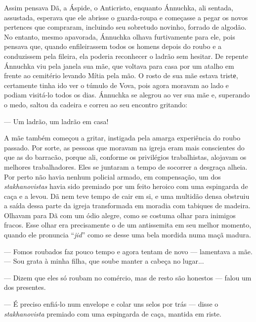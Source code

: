 Assim pensava Dã, a Áspide, o Anticristo, enquanto Ánnuchka, ali
sentada, assustada, esperava que ele abrisse o guarda-roupa e começasse
a pegar os novos pertences que compraram, incluindo seu sobretudo
novinho, forrado de algodão. No entanto, mesmo apavorada, Ánnuchka
olhava furtivamente para ele, pois pensava que, quando enfileirassem
todos os homens depois do roubo e a conduzissem pela fileira, ela
poderia reconhecer o ladrão sem hesitar. De repente Ánnuchka viu pela
janela sua mãe, que voltava para casa por um atalho em frente ao
cemitério levando Mítia pela mão. O rosto de sua mãe estava tristе,
certamente tinha ido ver o túmulo de Vova, pois agora moravam ao lado e
podiam visitá-lo todos os dias. Ánnuchka se alegrou ao ver sua mãe e,
superando o medo, saltou da cadeira e correu ao seu encontro gritando:

--- Um ladrão, um ladrão em casa!

A mãe também começou a gritar, instigada pela amarga experiência do
roubo passado. Por sorte, as pessoas que moravam na igreja eram mais
conscientes do que as do barracão, porque ali, conforme os privilégios
trabalhistas, alojavam os melhores trabalhadores. Eles se juntaram a
tempo de socorrer a desgraça alheia. Por perto não havia nenhum policial
armado, em compensação, um dos \emph{stakhanovistas} havia sido premiado
por um feito heroico com uma espingarda de caça e a levou. Dã nem teve
tempo de cair em si, e uma multidão densa obstruiu a saída dessa parte
da igreja transformada em moradia com tabiques de madeira. Olhavam para
Dã com um ódio alegre, como se costuma olhar para inimigos fracos. Esse
olhar era precisamente o de um antissemita em seu melhor momento, quando
ele pronuncia ``\emph{jid}'' como se desse uma bela mordida numa maçã
madura.

--- Fomos roubados faz pouco tempo e agora tentam de novo --- lamentava
a mãe. --- Sou grata à minha filha, que soube manter a cabeça no
lugar...

--- Dizem que eles só roubam no comércio, mas de resto são honestos ---
falou um dos presentes.

--- É preciso enfiá-lo num envelope e colar uns selos por trás --- disse
o \emph{stakhanovista} premiado com uma espingarda de caça, mantida em
riste.

